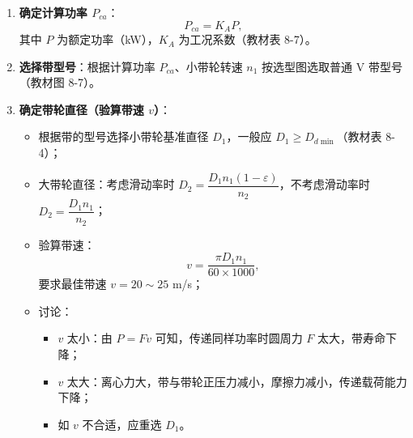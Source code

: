 \begin{enumerate}
	\item \textbf{确定计算功率 $P_{ca}$}：
	      \begin{equation}
		      P_{ca}=K_AP,
		      \label{eq:带传动:计算功率}
	      \end{equation}
	      其中 $P$ 为额定功率（kW），$K_A$ 为工况系数（教材表 8-7）。

	\item \textbf{选择带型号}：根据计算功率 $P_{ca}$、小带轮转速 $n_1$ 按选型图选取普通 V 带型号（教材图 8-7）。

	\item \textbf{确定带轮直径（验算带速 $v$）}：
	      \begin{itemize}
		      \item 根据带的型号选择小带轮基准直径 $D_1$，一般应 $D_1\ge D_{d\min}$（教材表 8-4）；
		      \item 大带轮直径：考虑滑动率时 $D_2=\dfrac{D_1n_1(1-\varepsilon)}{n_2}$，不考虑滑动率时 $D_2=\dfrac{D_1n_1}{n_2}$；
		      \item 验算带速：
		            \begin{equation}
			            v=\frac{\pi D_1n_1}{60\times 1000},
			            \label{eq:带传动:验算带速}
		            \end{equation}
		            要求最佳带速 $v=20\sim25$ m/s；
		      \item 讨论：
		            \begin{itemize}
			            \item $v$ 太小：由 $P=Fv$ 可知，传递同样功率时圆周力 $F$ 太大，带寿命下降；
			            \item $v$ 太大：离心力大，带与带轮正压力减小，摩擦力减小，传递载荷能力下降；
			            \item 如 $v$ 不合适，应重选 $D_1$。
		            \end{itemize}
	      \end{itemize}


\end{enumerate}
